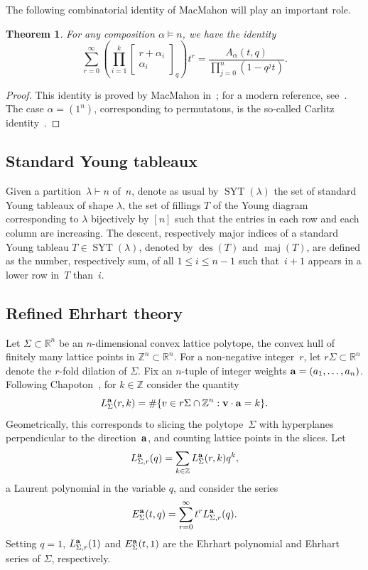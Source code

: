 \documentclass[a4paper,11pt]{amsart}
\theoremstyle{plain}
\newtheorem{theorem}{Theorem}[section]
\theoremstyle{definition}
\newcommand{\R}{\mathbb{R}}
\newcommand{\Z}{\mathbb{Z}}
\DeclareMathOperator{\SYT}{SYT}
\DeclareMathOperator{\maj}{maj}
\DeclareMathOperator{\des}{des}
\newcommand{\ba}{{\bf a}}
\newcommand{\bv}{{\bf v}}
\begin{document}
The following combinatorial identity of MacMahon will play an important role. 

\begin{theorem} 
For any composition $\alpha \vDash n$, we have the identity 
\begin{equation} \sum_{r=0}^\infty \left(\prod_{i=1}^k  \left[\begin{array}{c} r+\alpha_i\\ \alpha_i\end{array}\right]_q\right) t^r=  \frac{A_\alpha(t,q)}{\prod_{j=0}^n (1-q^jt)}.
\label{eq:mmcarlitz} 
\end{equation}
\end{theorem}
\begin{proof} This identity is proved by MacMahon in~\cite[Vol. 2 Sect. IX]{Mac}; for a modern reference, see~\cite[Sect. 3]{Gessel}. The case $\alpha=(1^n)$, corresponding to permutatons, is the so-called Carlitz identity~\cite{Carlitz}.
\end{proof}

\subsection{Standard Young tableaux} \label{subsec:SYT} Given a partition~$\lambda\vdash n$ of~$n$, denote as usual by $\SYT(\lambda)$ the set of standard Young tableaux of shape $\lambda$, the set of fillings $T$ of the Young diagram corresponding to $\lambda$ bijectively by $[n]$ such that the entries in each row and each column are increasing. The descent, respectively major indices of a standard Young tableau $T\in \SYT(\lambda)$, denoted by $\des(T)$ and $\maj(T)$, are defined as the number, respectively sum, of all $1\leq i\leq n-1$ such that~$i + 1$ appears in a lower row in~$T$ than~$i$.

\subsection{Refined Ehrhart theory}\label{sec_qEhr}

Let $\Sigma\subset\R^n$ be an $n$-dimensional convex lattice polytope, the convex hull of finitely many lattice points in $\Z^n\subset\R^n$. 
For a non-negative integer~$r$, let $r\Sigma\subset\R^n$ denote the $r$-fold dilation of $\Sigma$. Fix an $n$-tuple of integer weights ${\bf a}=(a_1, \ldots, a_n)$. Following Chapoton~\cite{Chapoton}, for $k\in\Z$ consider the quantity
\[ L^\ba_\Sigma(r,k) = \#\{ v \in r\Sigma \cap \Z^n : \bv\cdot {\ba} =k \}.\]
Geometrically, this corresponds to slicing the polytope~$\Sigma$ with hyperplanes perpendicular to the direction~$\ba$, and counting lattice points in the slices. Let
\[ L^\ba_{\Sigma,r}(q) = \sum_{k\in\Z} L^\ba_\Sigma(r,k)q^k,\]
a Laurent polynomial in the variable $q$, and consider the series
\[ E^\ba_{\Sigma}(t,q) = \sum_{r=0}^\infty  t^r L^\ba_{\Sigma,r}(q)  .
\]
Setting $q=1$, $L^\ba_{\Sigma,r}(1)$ and $E^\ba_{\Sigma}(t,1)$ are the Ehrhart polynomial and Ehrhart series of $\Sigma$, respectively. 
\end{document}
